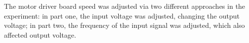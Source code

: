 The motor driver board speed was adjusted via two different approaches in the experiment: in part one, the input voltage was adjusted, changing the output voltage;  in part two, the frequency of the input signal was adjusted, which also affected output voltage.




